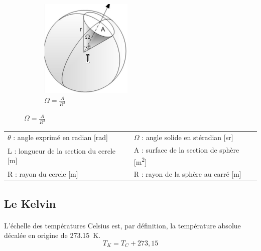 \documentclass{article}
\begin{document}
\begin{figure}[H]
\begin{subfigure}[b]{0.15\linewidth}
                    \includegraphics[width=\linewidth]{./images/011-steradian.png}
                    \caption{$\Omega = \frac{A}{R^2}$}
                \end{subfigure}
            \end{figure}
            \begin{table}[H]
            \centering
            \begin{tabular}{l|l}
                $\theta$ : angle exprimé en radian [\si{\radian}] & $\Omega$ : angle solide en stéradian [\si{\steradian}]\\
                L : longueur de la section du cercle [\si{\meter}] & A : surface de la section de sphère [\si{\square \meter}]\\
                R : rayon du cercle [\si{\meter}] & R : rayon de la sphère au carré [\si{\meter}]\\
            \end{tabular}
            \end{table}

        \subsection{Le Kelvin}
            \paragraph{}
            L'échelle des températures Celsius est, par définition, la température absolue décalée en origine de \SI{273,15}{\kelvin}.
            $$T_K = T_C + 273,15$$
            
\end{document}
